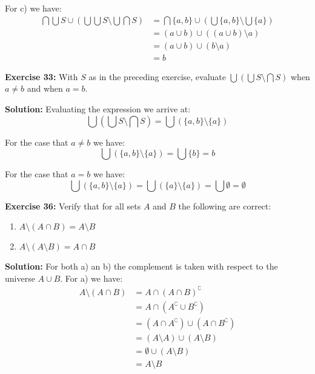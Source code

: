 \documentclass{article}
\begin{document}
For c) we have:
\begin{align*}
    \bigcap\bigcup S\cup \left(\bigcup\bigcup S\setminus\bigcup\bigcap S\right)&=\bigcap\{a,b\}\cup \left(\bigcup\{a,b\}\setminus\bigcup\{a\}\right)\\
    &=(a\cup b)\cup ((a\cup b)\setminus a)\\
    &=(a\cup b)\cup (b\setminus a)\\
    &=b
\end{align*}

\bigskip

\noindent\textbf{Exercise 33:} With $S$ as in the preceding exercise, evaluate $\bigcup(\bigcup S \setminus\bigcap S)$ when $a \not= b$ and when $a = b$.
\bigskip

\noindent\textbf{Solution:} Evaluating the expression we arrive at:
\begin{equation*}
    \bigcup\left(\bigcup S \setminus\bigcap S\right)=\bigcup\left(\{a,b\} \setminus\{a\}\right)
\end{equation*}

For the case that $a\not= b$ we have:
\begin{equation*}
    \bigcup\left(\{a,b\} \setminus\{a\}\right)=\bigcup\{b\}=b
\end{equation*}

For the case that $a = b$ we have:
\begin{equation*}
    \bigcup\left(\{a,b\} \setminus\{a\}\right)=\bigcup\left(\{a\} \setminus\{a\}\right)=\bigcup\emptyset=\emptyset
\end{equation*}

\bigskip

\noindent\textbf{Exercise 36:} Verify that for all sets $A$ and $B$ the following are correct:
\begin{enumerate}[label=\alph*)]
    \item $A\setminus(A\cap B) = A\setminus B$
    \item $A\setminus(A\setminus B) = A\cap B$
\end{enumerate}
\smallskip

\noindent\textbf{Solution:} For both a) an b) the complement is taken with respect to the universe $A\cup B$. For a) we have:
\begin{align*}
    A\setminus(A\cap B)&=A\cap(A\cap B)^\complement\tag{relative complement}\\
    &=A\cap(A^\complement\cup B^\complement)\tag{DeMorgan's Law}\\
    &=(A\cap A^\complement)\cup (A\cap B^\complement)\tag{distributivity of intersection}\\
    &=(A\setminus A)\cup (A\setminus B)\tag{relative complement}\\
    &=\emptyset\cup (A\setminus B)\\
    &=A\setminus B\\
\end{align*}
\end{document}
